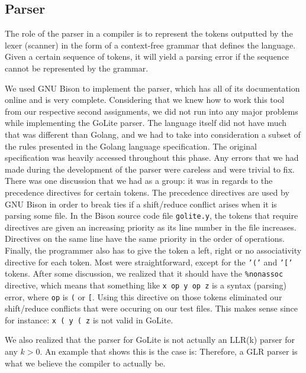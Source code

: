 \documentclass{article}
\begin{document}
\subsection{Parser}

The role of the parser in a compiler is to represent the tokens outputted by the lexer (scanner) in the form of a context-free grammar that defines the language. Given a certain sequence of tokens, it will yield a parsing error if the sequence cannot be represented by the grammar. 

We used GNU Bison to implement the parser, which has all of its documentation online and is very complete. Considering that we knew how to work this tool from our respective second assignments, we did not run into any major problems while implementing the GoLite parser. The language itself did not have much that was different than Golang, and we had to take into consideration a subset of the rules presented in the Golang language specification\cite{gospec}. The original specification was heavily accessed throughout this phase. Any errors that we had made during the development of the parser were careless and were trivial to fix. There was one discussion that we had as a group: it was in regards to the precedence directives for certain tokens. The precedence directives are used by GNU Bison in order to break ties if a shift/reduce conflict arises when it is parsing some file. In the Bison source code file \texttt{golite.y}, the tokens that require directives are given an increasing priority as its line number in the file increases. Directives on the same line have the same priority in the order of operations. Finally, the programmer also has to give the token a left, right or no associativity directive for each token. Most were straightforward, except for the \texttt{'('} and \texttt{'['} tokens. After some discussion, we realized that it should have the \verb|%nonassoc| directive, which means that something like \texttt{x op y op z} is a syntax (parsing) error, where \texttt{op} is \texttt{(} or \texttt{[}. Using this directive on those tokens eliminated our shift/reduce conflicts that were occuring on our test files. This makes sense since for instance: \texttt{x ( y ( z} is not valid in GoLite.

We also realized that the parser for GoLite is not actually an LLR(k) parser for any $k>0$. An example that shows this is the case is:
Therefore, a GLR parser is what we believe the compiler to actually be.
\end{document}
